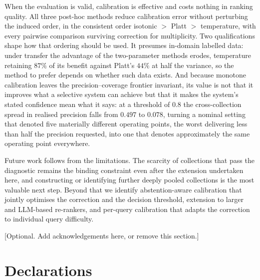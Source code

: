 \documentclass[sn-mathphys-num,pdflatex]{sn-jnl}
\begin{document}
When the evaluation is valid, calibration is effective and costs nothing in ranking
quality. All three post-hoc methods reduce calibration error without perturbing the
induced order, in the consistent order isotonic $>$ Platt $>$ temperature, with every
pairwise comparison surviving correction for multiplicity. Two qualifications shape
how that ordering should be used. It presumes in-domain labelled data: under transfer
the advantage of the two-parameter methods erodes, temperature retaining $87\%$ of
its benefit against Platt's $44\%$ at half the variance, so the method to prefer
depends on whether such data exists. And because monotone calibration leaves the
precision--coverage frontier invariant, its value is not that it improves what a
selective system can achieve but that it makes the system's stated confidence mean
what it says: at a threshold of $0.8$ the cross-collection spread in realised
precision falls from $0.497$ to $0.078$, turning a nominal setting that denoted five
materially different operating points, the worst delivering less than half the
precision requested, into one that denotes approximately the same operating point
everywhere.

Future work follows from the limitations. The scarcity of collections that pass the
diagnostic remains the binding constraint even after the extension undertaken here,
and constructing or identifying further deeply pooled collections is the most
valuable next step. Beyond that we identify abstention-aware calibration that jointly optimises the
correction and the decision threshold, extension to larger and LLM-based re-rankers,
and per-query calibration that adapts the correction to individual query difficulty.

\backmatter

[Optional. Add acknowledgements here, or remove this section.]

\section*{Declarations}
\end{document}
